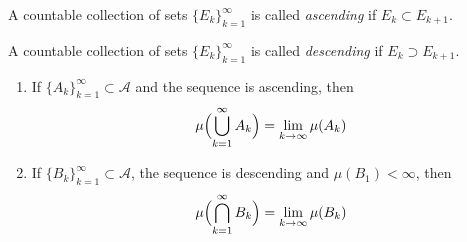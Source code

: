 \begin{definition}
    A countable collection of sets $\{E_k\}_{k=1}^\infty$ is called
    \textit{ascending} if $E_k \subset E_{k+1}$.
\end{definition}
\begin{definition}
    A countable collection of sets $\{E_k\}_{k=1}^\infty$ is called
    \textit{descending} if $E_k \supset E_{k+1}$.
\end{definition}

\begin{theorem}
    \label{the:continuityOfMeasure}
    \mbox{}
    \begin{enumerate}
        \item {
            If $\{A_k\}_{k=1}^\infty \subset \mathcal{A}$ and the sequence is ascending,
            then
            \[
                \mu\Bigl(\bigcup_{k=1}^\infty A_k\Bigr) = \lim_{k \to \infty} \mu(A_k)
            \]
        }
        \item {
            If $\{B_k\}_{k=1}^\infty \subset \mathcal{A}$, the sequence is descending and $\mu(B_1) < \infty$,
            then
            \[
                \mu\Bigl(\bigcap_{k=1}^\infty B_k\Bigr) = \lim_{k \to \infty} \mu(B_k)
            \]
        }
    \end{enumerate}
\end{theorem}
